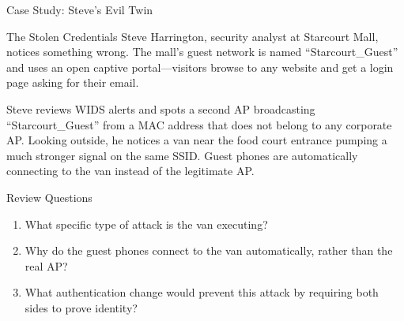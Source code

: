 \documentclass[aspectratio=169]{beamer}
\begin{document}
\begin{frame}{Case Study: Steve's Evil Twin}
    \begin{casestudy}{The Stolen Credentials}
        \footnotesize
        Steve Harrington, security analyst at Starcourt Mall, notices something wrong. The mall's guest network is named ``Starcourt\_Guest'' and uses an open captive portal---visitors browse to any website and get a login page asking for their email.

        \vspace{0.3em}
        Steve reviews WIDS alerts and spots a second AP broadcasting ``Starcourt\_Guest'' from a MAC address that does not belong to any corporate AP. Looking outside, he notices a van near the food court entrance pumping a much stronger signal on the same SSID. Guest phones are automatically connecting to the van instead of the legitimate AP.
    \end{casestudy}

    \begin{block}{Review Questions}
        \footnotesize
        \begin{enumerate}
            \item What specific type of attack is the van executing?
            \item Why do the guest phones connect to the van automatically, rather than the real AP?
            \item What authentication change would prevent this attack by requiring both sides to prove identity?
        \end{enumerate}
    \end{block}
\end{frame}
\end{document}
